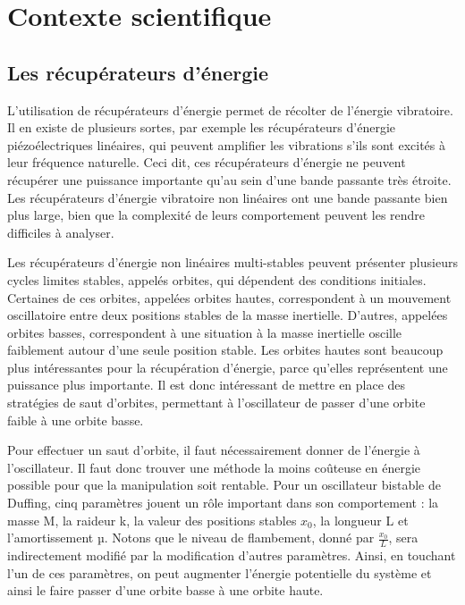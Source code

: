 \documentclass[a4paper, french, 12pt, titlepage]{article}
\begin{document}
\newpage

\section{Contexte scientifique}


\subsection{Les récupérateurs d'énergie}

L'utilisation de récupérateurs d'énergie permet de récolter de l'énergie vibratoire. Il en existe de plusieurs sortes, par exemple les récupérateurs d'énergie piézoélectriques linéaires, qui peuvent amplifier les vibrations s'ils sont excités à leur fréquence naturelle. Ceci dit, ces récupérateurs d'énergie ne peuvent récupérer une puissance importante qu'au sein d'une bande passante très étroite. Les récupérateurs d'énergie vibratoire non linéaires ont une bande passante bien plus large, bien que la complexité de leurs comportement peuvent les rendre difficiles à analyser. 

Les récupérateurs d'énergie non linéaires multi-stables peuvent présenter plusieurs cycles limites stables, appelés orbites, qui dépendent des conditions initiales. Certaines de ces orbites, appelées orbites hautes, correspondent à un mouvement oscillatoire entre deux positions stables de la masse inertielle. D'autres, appelées orbites basses, correspondent à une situation à la masse inertielle oscille faiblement autour d'une seule position stable. Les orbites hautes sont beaucoup plus intéressantes pour la récupération d'énergie, parce qu'elles représentent une puissance plus importante. Il est donc intéressant de mettre en place des stratégies de saut d'orbites, permettant à l'oscillateur de passer d'une orbite faible à une orbite basse. 

Pour effectuer un saut d'orbite, il faut nécessairement donner de l'énergie à l'oscillateur. Il faut donc trouver une méthode la moins coûteuse en énergie possible pour que la manipulation soit rentable. Pour un oscillateur bistable de Duffing, cinq paramètres jouent un rôle important dans son comportement : la masse M, la raideur k, la valeur des positions stables $x_0$, la longueur L et l'amortissement µ. Notons que le niveau de flambement, donné par $\frac{x_0}{L}$, sera indirectement modifié par la modification d'autres paramètres. Ainsi, en touchant l'un de ces paramètres, on peut augmenter l'énergie potentielle du système et ainsi le faire passer d'une orbite basse à une orbite haute. 
\end{document}
